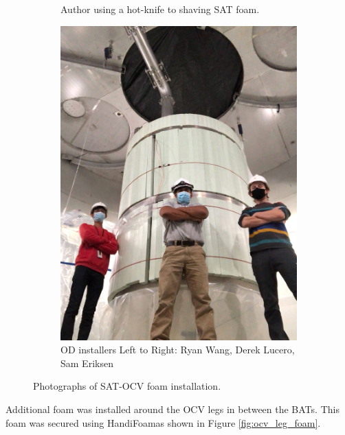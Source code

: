 \begin{figure}[!htbp]
\begin{subfigure}{.5\textwidth}
  \caption{Author using a hot-knife to shaving SAT foam.}
  \label{fig:foam_saving}
  \end{subfigure}
  \begin{subfigure}{.5\textwidth}
  \centering
  \includegraphics[width=\linewidth]{Figures/Construction/SAT_foam_fittest.jpg}
  \caption{OD installers Left to Right: Ryan Wang, Derek Lucero, Sam Eriksen}
  \label{fig:SAT_foam_guys}
  \end{subfigure}
\caption{Photographs of SAT-OCV foam installation.}
\label{fig:SAT_foam_installation}
\end{figure}

\par
Additional foam was installed around the OCV legs in between the BATs.
This foam was secured using HandiFoam\textregistered as shown in Figure \ref{fig:ocv_leg_foam}.

